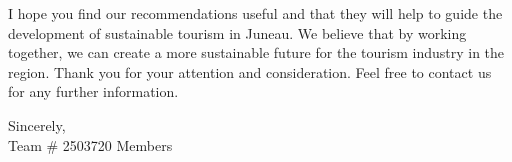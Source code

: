 {I hope you find our recommendations useful and that they will help to guide
the development of sustainable tourism in Juneau. We believe that by working
together, we can create a more sustainable future for the tourism industry in
the region. Thank you for your attention and consideration. Feel free to contact us for any further information.

\begin{flushright}
    Sincerely,\\
    Team \# 2503720 Members
    \end{flushright}

}

\clearpage